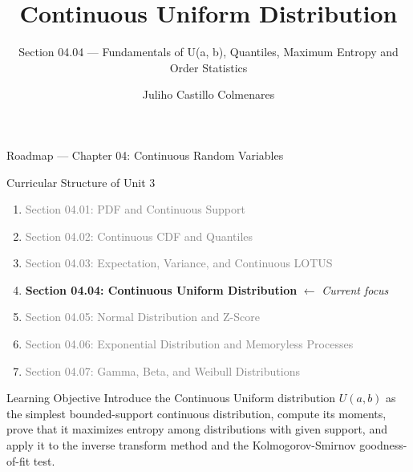 \documentclass[aspectratio=169,xcolor={dvipsnames,table}]{beamer}
\title{Continuous Uniform Distribution}
\subtitle{Section 04.04 --- Fundamentals of U(a, b), Quantiles, Maximum Entropy and Order Statistics}
\author[J. Castillo Colmenares]{Juliho Castillo Colmenares}
\institute[Tec de Monterrey]{Tecnologico de Monterrey}
\date{\vspace{-1.5cm}}
\begin{document}
\begin{frame}[plain]
	\titlepage
\end{frame}

\begin{frame}{Roadmap --- Chapter 04: Continuous Random Variables}
	\vspace{-0.15cm}
	\begin{block}{Curricular Structure of Unit 3}
		\footnotesize
		\begin{enumerate}\itemsep=0.03cm
			\item \textcolor{gray}{Section 04.01: PDF and Continuous Support}
			\item \textcolor{gray}{Section 04.02: Continuous CDF and Quantiles}
			\item \textcolor{gray}{Section 04.03: Expectation, Variance, and Continuous LOTUS}
			\item \textbf{\textcolor{TecRojo}{Section 04.04: Continuous Uniform Distribution}} $\leftarrow$ \emph{Current focus}
			\item \textcolor{gray}{Section 04.05: Normal Distribution and Z-Score}
			\item \textcolor{gray}{Section 04.06: Exponential Distribution and Memoryless Processes}
			\item \textcolor{gray}{Section 04.07: Gamma, Beta, and Weibull Distributions}
		\end{enumerate}
	\end{block}
	\vspace{-0.2cm}
	\begin{alertblock}{Learning Objective}
		\scriptsize
		Introduce the Continuous Uniform distribution $U(a, b)$ as the simplest bounded-support continuous distribution, compute its moments, prove that it maximizes entropy among distributions with given support, and apply it to the inverse transform method and the Kolmogorov-Smirnov goodness-of-fit test.
	\end{alertblock}
\end{frame}
\end{document}
